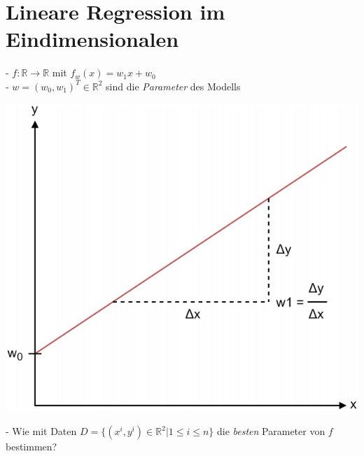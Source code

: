 \documentclass{report}
\begin{document}
\section{Lineare Regression im Eindimensionalen}
- $f : \mathbb{R} \rightarrow \mathbb{R}$ mit $f_w(x) = w_1x + w_0$\\
- $w = (w_0, w_1)^T \in \mathbb{R}^2$ sind die \textit{Parameter} des Modells
\begin{center}
  \includegraphics[scale=0.275]{ml02_1}
\end{center}
- Wie mit Daten $D = \{(x^i, y^i) \in \mathbb{R}^2 | 1 \leq i \leq n\}$ die \textit{besten} Parameter von $f$ bestimmen?\\
\end{document}
